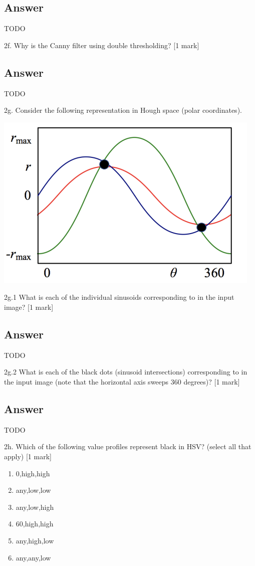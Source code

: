 \documentclass[
	12pt, %
]{fphw}
\begin{document}
\subsection*{Answer}
TODO
\begin{problem}
2f. Why is the Canny filter using double thresholding? [1 mark]
\end{problem}
\subsection*{Answer}
TODO
\begin{problem}
2g. Consider the following representation in Hough space (polar coordinates).
\begin{center}
	\includegraphics[width=0.5\columnwidth, page=1]{2g.png}
\end{center}
\begin{problem}
2g.1 What is each of the individual sinusoids corresponding to in the input image? [1
mark]
\end{problem}
\subsection*{Answer}
TODO
\begin{problem}
2g.2 What is each of the black dots (sinusoid intersections) corresponding to in the input
image (note that the horizontal axis sweeps 360 degrees)? [1 mark]
\end{problem}
\subsection*{Answer}
TODO
\end{problem}
\begin{problem}
2h. Which of the following value profiles represent black in HSV? (select all that apply)
[1 mark]
\begin{enumerate}
	\item 0,high,high
	\item any,low,low
	\item any,low,high
	\item 60,high,high
	\item any,high,low
	\item any,any,low
\end{enumerate}
\end{problem}
\end{document}
